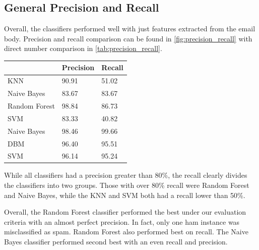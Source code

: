 \documentclass[12pt]{article}
\newenvironment{Figure}
  {\par\medskip\noindent\minipage{\linewidth}}
  {\endminipage\par\medskip}
\begin{document}
    \begin{multicols}{2}
            \subsection{General Precision and Recall}
                Overall, the classifiers performed well with just features extracted from the email body.
                Precision and recall comparison can be found in \autoref{fig:precision_recall} with direct 
                number comparison in \autoref{tab:precision_recall}. 

                \begin{Figure}
                    \begin{tabular}{|l|l|l|}
                        \hline
                        & Precision & Recall \\ \hline
                        KNN                                 & 90.91     & 51.02  \\ \hline
                        Naive Bayes                         & 83.67     & 83.67  \\ \hline
                        Random Forest                       & 98.84     & 86.73  \\ \hline
                        SVM                                 & 83.33     & 40.82  \\ \hline
                        Naive Bayes \cite{hovold2005naive}  & 98.46     & 99.66  \\ \hline
                        DBM \cite{tzortzis2007deep}         & 96.40     & 95.51  \\ \hline
                        SVM \cite{tzortzis2007deep}         & 96.14     & 95.24  \\ \hline
                    \end{tabular}
                    \label{tab:precision_recall}
                \end{Figure}
                
                While all classifiers had a precision greater than 80\%, the recall clearly divides the 
                classifiers into two groups. Those with over 80\% recall were Random Forest and Naive Bayes, 
                while the KNN and SVM both had a recall lower than 50\%. 
                
                Overall, the Random Forest classifier performed the best under our evaluation criteria 
                with an almost perfect precision. In fact, only one ham instance was misclassified as spam. 
                Random Forest also performed best on recall. The Naive Bayes classifier performed second best 
                with an even recall and precision.


\end{multicols}
\end{document}
